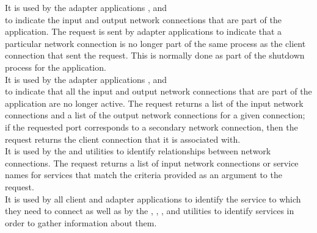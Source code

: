 It is used by the adapter applications ,
 and\\
 to indicate the input and output
\yarp{} network connections that are part of the application.
The  request is sent by
adapter applications to indicate that a particular \yarp{} network connection is no
longer part of the same process as the client connection that sent the request.
This is normally done as part of the shutdown process for the application.\\

It is used by the adapter applications ,
 and\\
 to indicate that all the input and
output \yarp{} network connections that are part of the application are no longer active.
The  request returns
a list of the input \yarp{} network connections and a list of the output \yarp{} network
connections for a given connection; if the requested port corresponds to a secondary
\yarp{} network connection, then the request returns the client connection that it is
associated with.\\

It is used by the  and
 utilities to identify relationships
between \yarp{} network connections.
The  request returns a list of
input \yarp{} network connections or service names for services that match the criteria
provided as an argument to the request.\\

It is used by all client and adapter applications to identify the service to which they
need to connect as well as by the ,
, ,
 and 
utilities to identify services in order to gather information about them.\\

